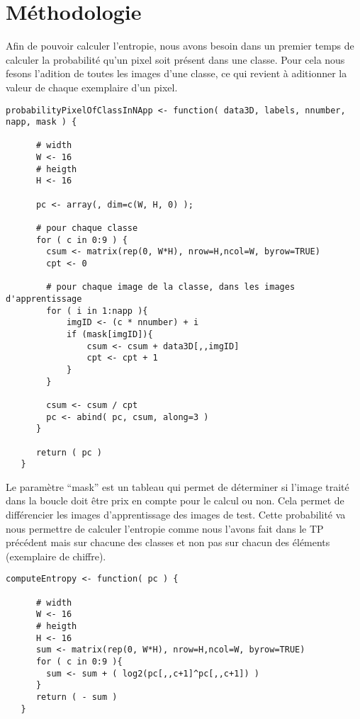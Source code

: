 \documentclass[a4paper,11pt]{article}
\begin{document}
  \section{Méthodologie}
  Afin de pouvoir calculer l'entropie, nous avons besoin dans un premier temps de calculer la probabilité qu'un 
  pixel soit présent dans une classe. Pour cela nous fesons l'adition de toutes les images d'une classe,
  ce qui revient à aditionner la valeur de chaque exemplaire d'un pixel.
  
  \begin{lstlisting}[caption=Fonction de calcul de la probabilité de la présence d'un pixel]
    probabilityPixelOfClassInNApp <- function( data3D, labels, nnumber, napp, mask ) {

      # width
      W <- 16
      # heigth
      H <- 16

      pc <- array(, dim=c(W, H, 0) );

      # pour chaque classe
      for ( c in 0:9 ) {
        csum <- matrix(rep(0, W*H), nrow=H,ncol=W, byrow=TRUE)
        cpt <- 0

        # pour chaque image de la classe, dans les images d'apprentissage 
        for ( i in 1:napp ){
            imgID <- (c * nnumber) + i
            if (mask[imgID]){
                csum <- csum + data3D[,,imgID]
                cpt <- cpt + 1
            }
        }

        csum <- csum / cpt
        pc <- abind( pc, csum, along=3 )
      }

      return ( pc )
   }
  \end{lstlisting}
  
  Le paramètre \enquote{mask} est un tableau qui permet de déterminer si l'image traité dans la boucle doit être 
  prix en compte pour le calcul ou non. Cela permet de différencier les images d'apprentissage des images de test.
  Cette probabilité va nous permettre de calculer l'entropie comme nous l'avons fait dans le TP précédent mais sur chacune
  des classes et non pas sur chacun des éléments (exemplaire de chiffre).
  
  \begin{lstlisting}[caption=Fonction de calcul de l'entropie]
   computeEntropy <- function( pc ) {
 
      # width
      W <- 16
      # heigth
      H <- 16
      sum <- matrix(rep(0, W*H), nrow=H,ncol=W, byrow=TRUE)
      for ( c in 0:9 ){
        sum <- sum + ( log2(pc[,,c+1]^pc[,,c+1]) )
      }
      return ( - sum )
   }
  \end{lstlisting}
  
\end{document}
